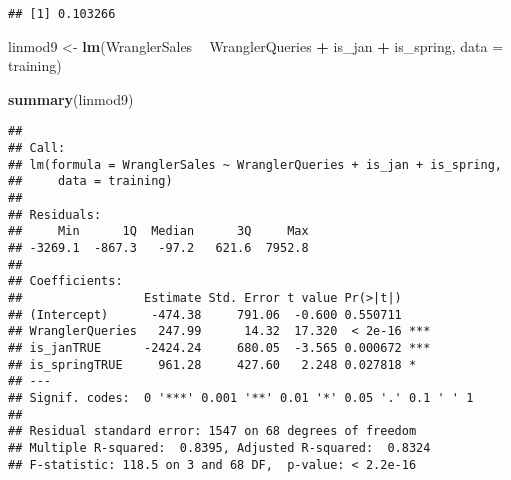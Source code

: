 \documentclass[]{article}
\newenvironment{Shaded}{\begin{snugshade}}{\end{snugshade}}
\newcommand{\KeywordTok}[1]{\textcolor[rgb]{0.13,0.29,0.53}{\textbf{#1}}}
\newcommand{\DataTypeTok}[1]{\textcolor[rgb]{0.13,0.29,0.53}{#1}}
\newcommand{\DecValTok}[1]{\textcolor[rgb]{0.00,0.00,0.81}{#1}}
\newcommand{\StringTok}[1]{\textcolor[rgb]{0.31,0.60,0.02}{#1}}
\newcommand{\CommentTok}[1]{\textcolor[rgb]{0.56,0.35,0.01}{\textit{#1}}}
\newcommand{\OperatorTok}[1]{\textcolor[rgb]{0.81,0.36,0.00}{\textbf{#1}}}
\newcommand{\NormalTok}[1]{#1}
\begin{document}
\begin{verbatim}
## [1] 0.103266
\end{verbatim}

\begin{Shaded}
\begin{Highlighting}[]
\NormalTok{linmod9 <-}\StringTok{ }\KeywordTok{lm}\NormalTok{(WranglerSales }\OperatorTok{~}\StringTok{ }\NormalTok{WranglerQueries }\OperatorTok{+}\StringTok{ }\NormalTok{is_jan }\OperatorTok{+}\StringTok{ }\NormalTok{is_spring, }\DataTypeTok{data =}\NormalTok{ training)}

\KeywordTok{summary}\NormalTok{(linmod9)}
\end{Highlighting}
\end{Shaded}

\begin{verbatim}
## 
## Call:
## lm(formula = WranglerSales ~ WranglerQueries + is_jan + is_spring, 
##     data = training)
## 
## Residuals:
##     Min      1Q  Median      3Q     Max 
## -3269.1  -867.3   -97.2   621.6  7952.8 
## 
## Coefficients:
##                 Estimate Std. Error t value Pr(>|t|)    
## (Intercept)      -474.38     791.06  -0.600 0.550711    
## WranglerQueries   247.99      14.32  17.320  < 2e-16 ***
## is_janTRUE      -2424.24     680.05  -3.565 0.000672 ***
## is_springTRUE     961.28     427.60   2.248 0.027818 *  
## ---
## Signif. codes:  0 '***' 0.001 '**' 0.01 '*' 0.05 '.' 0.1 ' ' 1
## 
## Residual standard error: 1547 on 68 degrees of freedom
## Multiple R-squared:  0.8395, Adjusted R-squared:  0.8324 
## F-statistic: 118.5 on 3 and 68 DF,  p-value: < 2.2e-16
\end{verbatim}

\begin{Shaded}
\end{Shaded}
\end{document}
